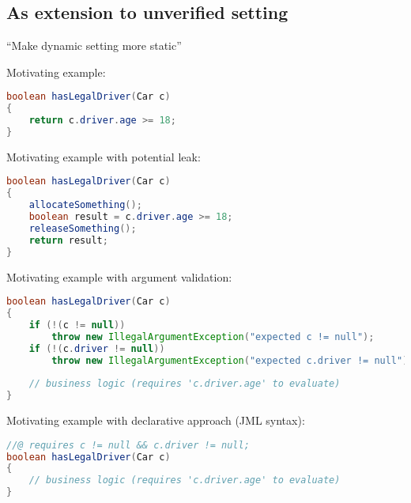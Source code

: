 
\subsection{As extension to unverified setting}
“Make dynamic setting more static”

\lstset{
    basicstyle=\ttfamily,
    commentstyle=\ttfamily,
    frame=single,
    framesep=5pt,
    mathescape=true
    }

Motivating example:
\begin{lstlisting}[language=Java]
boolean hasLegalDriver(Car c)
{
    return c.driver.age >= 18;
}
\end{lstlisting}

Motivating example with potential leak:
\begin{lstlisting}[language=Java]
boolean hasLegalDriver(Car c)
{
    allocateSomething();
    boolean result = c.driver.age >= 18;
    releaseSomething();
    return result;
}
\end{lstlisting}

Motivating example with argument validation:
\begin{lstlisting}[language=Java]
boolean hasLegalDriver(Car c)
{
    if (!(c != null))
        throw new IllegalArgumentException("expected c != null");
    if (!(c.driver != null))
        throw new IllegalArgumentException("expected c.driver != null");
        
    // business logic (requires 'c.driver.age' to evaluate)
}
\end{lstlisting}

Motivating example with declarative approach (JML syntax):
\begin{lstlisting}[language=Java]
//@ requires c != null && c.driver != null;
boolean hasLegalDriver(Car c)
{
    // business logic (requires 'c.driver.age' to evaluate)
}
\end{lstlisting}

